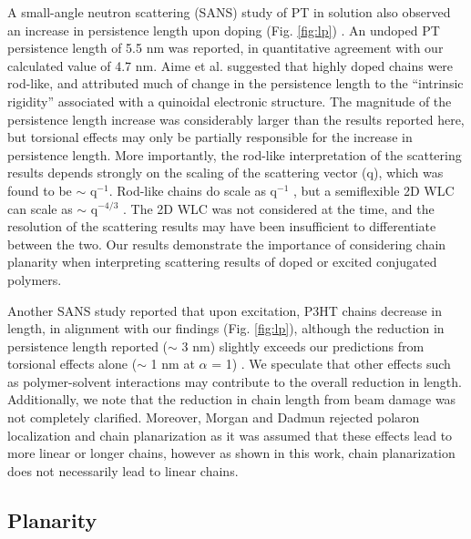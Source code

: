 A small-angle neutron scattering (SANS) study of PT in solution also observed an increase in persistence length upon doping (Fig. \ref{fig:lp}) \cite{Aime1989}. An undoped PT persistence length of 5.5 nm was reported, in quantitative agreement with our calculated value of 4.7 nm. Aime et al. suggested that highly doped chains were rod-like, and attributed much of change in the persistence length to the ``intrinsic rigidity'' associated with a quinoidal electronic structure. The magnitude of the persistence length increase was considerably larger than the results reported here, but torsional effects may only be partially responsible for the increase in persistence length. More importantly, the rod-like interpretation of the scattering results depends strongly on the scaling of the scattering vector (q), which was found to be $\sim$ q$^{-1}$. Rod-like chains do scale as q$^{-1}$ \cite{Pedersen1997}, but a semiflexible 2D WLC can scale as $\sim$ q$^{-4/3}$ \cite{Cifra2008}. The 2D WLC was not considered at the time, and the resolution of the scattering results may have been insufficient to differentiate between the two. Our results demonstrate the importance of considering chain planarity when interpreting scattering results of doped or excited conjugated polymers.

Another SANS study reported that upon excitation, P3HT chains decrease in length, in alignment with our findings (Fig. \ref{fig:lp}), although the reduction in persistence length reported ($\sim$ 3 nm) slightly exceeds our predictions from torsional effects alone ($\sim$ 1 nm at $\alpha$ = 1) \cite{Morgan2016}. We speculate that other effects such as polymer-solvent interactions may contribute to the overall reduction in length. Additionally, we note that the reduction in chain length from beam damage was not completely clarified. Moreover, Morgan and Dadmun rejected polaron localization and chain planarization as it was assumed that these effects lead to more linear or longer chains, however as shown in this work, chain planarization does not necessarily lead to linear chains.

\subsection{Planarity}

